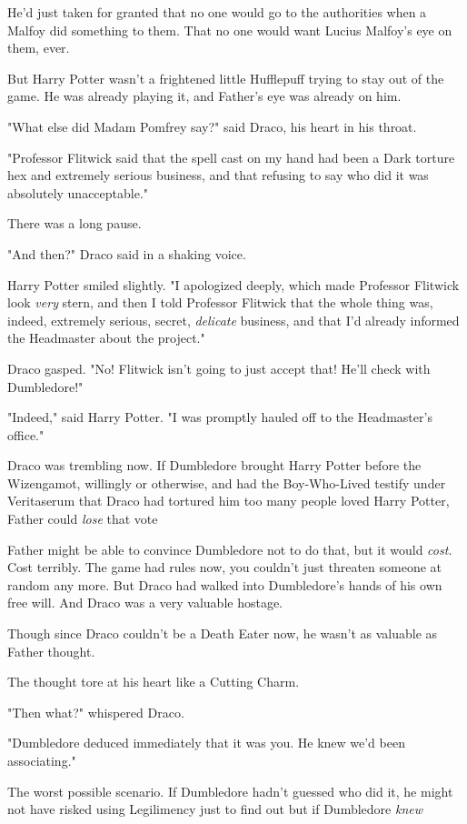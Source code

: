 He'd just taken for granted that no one would go to the authorities when a
Malfoy did something to them. That no one would want Lucius Malfoy's eye on
them, ever.

But Harry Potter wasn't a frightened little Hufflepuff trying to stay out of
the game. He was already playing it, and Father's eye was already on him.

"What else did Madam Pomfrey say?" said Draco, his heart in his throat.

"Professor Flitwick said that the spell cast on my hand had been a Dark torture
hex and extremely serious business, and that refusing to say who did it was
absolutely unacceptable."

There was a long pause.

"And then?" Draco said in a shaking voice.

Harry Potter smiled slightly. "I apologized deeply, which made Professor
Flitwick look \emph{very} stern, and then I told Professor Flitwick that the
whole thing was, indeed, extremely serious, secret, \emph{delicate} business,
and that I'd already informed the Headmaster about the project."

Draco gasped. "No! Flitwick isn't going to just accept that! He'll check with
Dumbledore!"

"Indeed," said Harry Potter. "I was promptly hauled off to the Headmaster's
office."

Draco was trembling now. If Dumbledore brought Harry Potter before the
Wizengamot, willingly or otherwise, and had the Boy-Who-Lived testify under
Veritaserum that Draco had tortured him{\el} too many people loved Harry
Potter, Father could \emph{lose} that vote{\el}

Father might be able to convince Dumbledore not to do that, but it would
\emph{cost.} Cost terribly. The game had rules now, you couldn't just threaten
someone at random any more. But Draco had walked into Dumbledore's hands of his
own free will. And Draco was a very valuable hostage.

Though since Draco couldn't be a Death Eater now, he wasn't as valuable as
Father thought.

The thought tore at his heart like a Cutting Charm.

"Then what?" whispered Draco.

"Dumbledore deduced immediately that it was you. He knew we'd been associating."

The worst possible scenario. If Dumbledore hadn't guessed who did it, he might
not have risked using Legilimency just to find out{\el} but if Dumbledore
\emph{knew{\el}}

